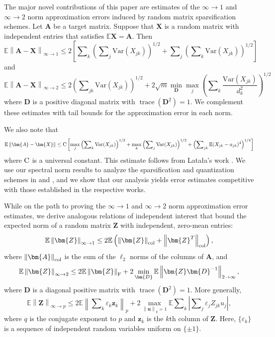 \documentclass[11pt,letterpaper,twoside,reqno]{amsart}
\newcommand{\mat}[1]{\ensuremath{\bm{#1}}}
\newcommand{\E}{\ensuremath{\mathbb{E}}}
\newcommand{\supoverqball}{\ensuremath{\max_{\qnorm{\mat{u}} = 1}}}
\newcommand{\norm}[1]{\ensuremath{\left\|#1\right\|}}
\newcommand{\qnorm}[1]{\ensuremath{\left\|#1\right\|_q}}
\newcommand{\infone}{\ensuremath{\infty\!\rightarrow\!\!1}}
\newcommand{\inftwo}{\ensuremath{\infty\!\rightarrow\!\!2}}
\newcommand{\colnorm}[1]{\ensuremath{\left\|#1\right\|_{\text{\rm col}}}}
\newcommand{\frobnorm}[1]{\ensuremath{\left\|#1\right\|_{\text{\rm F}}}}
\newcommand{\var}[1]{\ensuremath{\mathrm{Var}(#1)}}
\DeclareMathOperator{\trace}{trace}
\begin{document}
The major novel contributions of this paper are estimates of the $\infone$ and $\inftwo$ norm approximation errors induced by random matrix sparsification schemes. Let $\mat{A}$ be a target matrix. Suppose that $\mat{X}$ is a random matrix with independent entries that satisfies $\E \mat{X} = \mat{A}.$ Then
\[
\E\norm{\mat{A} - \mat{X}}_{\infty \rightarrow 1} \leq 2\left[\sum\nolimits_k\left(\sum\nolimits_j \var{X_{jk}} \right)^{1/2} + \sum\nolimits_j\left(\sum\nolimits_k \var{X_{jk}}\right)^{1/2} \right]
\] 
and
\[
\E\norm{\mat{A} - \mat{X}}_{\infty \rightarrow 2} \leq 2\left(\sum\nolimits_{jk} \var{X_{jk}} \right)^{1/2} + 2\sqrt{m}\min_{\mat{D}}\max_j\left(\sum\nolimits_k \frac{\var{X_{jk}}}{d_k^2}\right)^{1/2}
\]
where $\mat{D}$ is a positive diagonal matrix with $\trace (\mat{D}^2) = 1.$ We complement these estimates with tail bounds for the approximation error in each norm.

We also note that 
\[
\E\norm{\mat{A} - \mat{X}} \leq {\rm C}\left[\max_j\left(\sum\nolimits_k \var{X_{jk}}\right)^{1/2} + \max_k\left(\sum\nolimits_j \var{X_{jk}}\right)^{1/2} + \left(\sum\nolimits_{jk} \E(X_{jk} - a_{jk})^4\right)^{1/4} \right]
\]
where ${\rm C}$ is a universal constant. This estimate follows from Lata{\l}a's work \cite{Lat04}. We use our spectral norm results to analyze the sparsification and quantization schemes in \cite{AHK06} and \cite{AM07}, and we show that our analysis yields error estimates competitive with those established in the respective works.

While on the path to proving the $\infone$ and $\inftwo$ norm approximation error estimates, we derive analogous relations of independent interest that bound the expected norm of a random matrix $\mat{Z}$ with independent, zero-mean entries:
\[
\E\norm{\mat{Z}}_{\infty \rightarrow 1} \leq 2\E\left(\colnorm{\mat{Z}} + \colnorm{\mat{Z}^T}\right),
\]
where $\colnorm{\mat{A}}$ is the sum of the $\ell_2$ norms of the columns of $\mat{A}$, and
\[
\E\norm{\mat{Z}}_{\infty \rightarrow 2} \leq 2\E\frobnorm{\mat{Z}} + 2\min_{\mat{D}}\E\norm{\mat{Z}\mat{D}^{-1}}_{2\rightarrow \infty},
\]
where $\mat{D}$ is a diagonal positive matrix with $\trace(\mat{D}^2) = 1$. More generally,
\[
\E\norm{\mat{Z}}_{\infty\rightarrow p} \leq 2\E\norm{\sum\nolimits_k \varepsilon_k\mat{z}_k}_p + 2\supoverqball \E\sum\nolimits_k\left|\sum\nolimits_j \varepsilon_j Z_{jk} u_j\right|,
\]
where $q$ is the conjugate exponent to $p$ and $\mat{z}_k$ is the $k$th column of $\mat{Z}$. Here, $\{\varepsilon_k\}$ is a sequence of independent random variables uniform on $\{\pm 1\}.$
\end{document}

